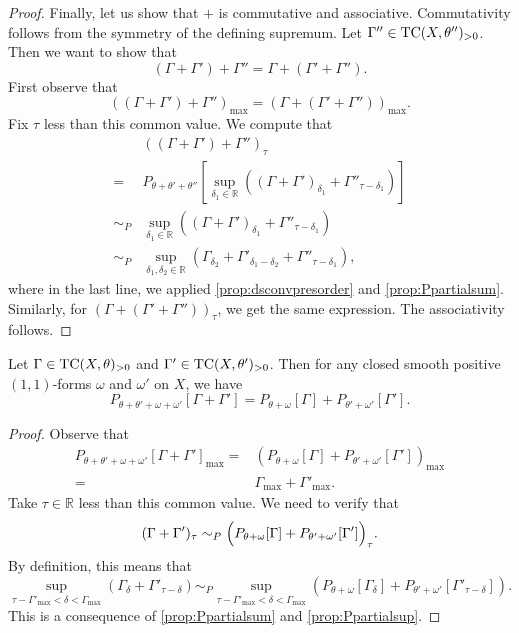 \begin{proof}
    Finally, let us show that $+$ is commutative and associative. Commutativity follows from the symmetry of the defining supremum. Let $\Gamma''\in \mathrm{TC}(X,\theta'')_{>0}$. Then we want to show that
    \[
    (\Gamma+\Gamma')+\Gamma''=\Gamma+(\Gamma'+\Gamma'').
    \]
    First observe that
    \[
    \left((\Gamma+\Gamma')+\Gamma'' \right)_{\max}=\left( \Gamma+(\Gamma'+\Gamma'')\right)_{\max}.
    \]
    Fix $\tau$ less than this common value. We compute that
    \[
    \begin{aligned}
    &\left( (\Gamma+\Gamma')+\Gamma''\right)_{\tau}\\
    =& P_{\theta+\theta'+\theta''}\left[\sup_{\delta_1\in \mathbb{R}} \left((\Gamma+\Gamma')_{\delta_1}+\Gamma''_{\tau-\delta_1}\right)\right]\\
    \sim_P & \sup_{\delta_1\in \mathbb{R}} \left((\Gamma+\Gamma')_{\delta_1}+\Gamma''_{\tau-\delta_1}\right)\\
    \sim_P & \sup_{\delta_1,\delta_2\in \mathbb{R}} \left(\Gamma_{\delta_2}+\Gamma'_{\delta_1-\delta_2}+\Gamma''_{\tau-\delta_1}\right),
    \end{aligned}
    \]
    where in the last line, we applied \cref{prop:dsconvpresorder} and \cref{prop:Ppartialsum}. Similarly, for $\left( \Gamma+(\Gamma'+\Gamma'')\right)_{\tau}$, we get the same expression. The associativity follows.
\end{proof}

\begin{lemma}\label{lma:testcursumcomp}
    Let $\Gamma \in \mathrm{TC}(X,\theta)_{>0}$ and $\Gamma' \in \mathrm{TC}(X,\theta')_{>0}$. Then for any closed smooth positive $(1,1)$-forms $\omega$ and $\omega'$ on $X$, we have
    \[
    P_{\theta+\theta'+\omega+\omega'}[\Gamma+\Gamma']=P_{\theta+\omega}[\Gamma]+P_{\theta'+\omega'}[\Gamma'].
    \]
\end{lemma}
\begin{proof}
    Observe that
    \[
    \begin{aligned}
    P_{\theta+\theta'+\omega+\omega'}[\Gamma+\Gamma']_{\max}=&\left(P_{\theta+\omega}[\Gamma]+P_{\theta'+\omega'}[\Gamma'] \right)_{\max}\\
    =&\Gamma_{\max}+\Gamma'_{\max}.
    \end{aligned}
    \]
    Take $\tau\in \mathbb{R}$ less than this common value. We need to verify that
    \[
    (\Gamma+\Gamma')_{\tau}\sim_P \Bigl( P_{\theta+\omega}[\Gamma]+P_{\theta'+\omega'}[\Gamma']\Bigr)_{\tau}.
    \]
    By definition, this means that
    \[
    \sup_{\tau-\Gamma'_{\max}<\delta<\Gamma_{\max}}\left(\Gamma_{\delta}+\Gamma'_{\tau-\delta}\right)\sim_P \sup_{\tau-\Gamma'_{\max}<\delta<\Gamma_{\max}}\left(P_{\theta+\omega}[\Gamma_{\delta}]+P_{\theta'+\omega'}[\Gamma'_{\tau-\delta}]\right).
    \]
    This is a consequence of \cref{prop:Ppartialsum} and \cref{prop:Ppartialsup}.
\end{proof}



